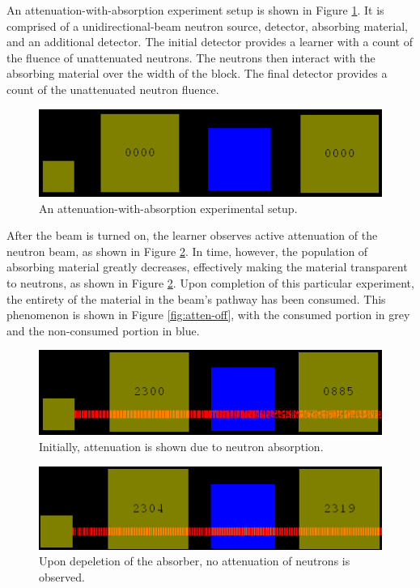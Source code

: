 \documentclass{anstrans}
\begin{document}
An attenuation-with-absorption experiment setup is shown in Figure
\ref{fig:atten-setup}. It is comprised of a unidirectional-beam neutron source,
detector, absorbing material, and an additional detector. The initial detector
provides a learner with a count of the fluence of unattenuated neutrons. The
neutrons then interact with the absorbing material over the width of the
block. The final detector provides a count of the unattenuated neutron fluence.

\begin{figure}
    \centering
    \includegraphics[width=\columnwidth]{atten-setup.png}
    \caption{An attenuation-with-absorption experimental setup.}
    \label{fig:atten-setup}
\end{figure}

After the beam is turned on, the learner observes active attenuation of the
neutron beam, as shown in Figure \ref{fig:atten-on}. In time, however, the
population of absorbing material greatly decreases, effectively making the
material transparent to neutrons, as shown in Figure \ref{fig:atten-on}. Upon
completion of this particular experiment, the entirety of the material in the
beam's pathway has been consumed. This phenomenon is shown in Figure
\ref{fig:atten-off}, with the consumed portion in grey and the non-consumed
portion in blue.

\begin{figure}
    \centering
    \includegraphics[width=\columnwidth]{atten-on.png}
    \caption{Initially, attenuation is shown due to neutron absorption.}
    \label{fig:atten-on}
\end{figure}

\begin{figure}
    \centering
    \includegraphics[width=\columnwidth]{atten-done.png}
    \caption{Upon depeletion of the absorber, no attenuation of neutrons is observed.}
    \label{fig:atten-done}
\end{figure}
\end{document}
